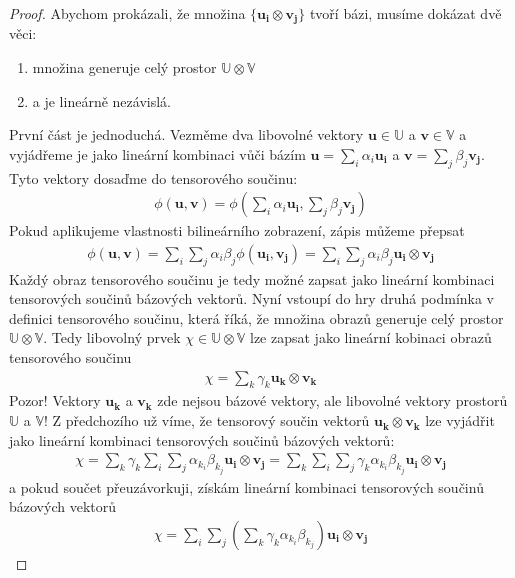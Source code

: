 \documentclass[a5paper,12pt]{amsbook}
\theoremstyle{definition}
\newcommand{\myvec}[1]{\bm{#1}}
\newcommand{\myspace}[1]{\mathbb{#1}}
\begin{document}
\begin{proof}
Abychom prokázali, že množina $\{\myvec{u_i}\otimes\myvec{v_j}\}$ tvoří bázi, musíme dokázat
dvě věci:
\begin{enumerate}
	\item množina generuje celý prostor $\myspace{U}\otimes\myspace{V}$
	\item a je lineárně nezávislá.
\end{enumerate}

První část je jednoduchá. Vezměme dva libovolné vektory $\myvec{u}\in\myspace{U}$ a
$\myvec{v}\in\myspace{V}$ a vyjádřeme je jako lineární kombinaci vůči bázím
$\myvec{u} = \sum_{i}\alpha_i\myvec{u_i}$ a $\myvec{v} = \sum_{j}\beta_j\myvec{v_j}$.
Tyto vektory dosaďme do tensorového součinu:
\begin{equation*}
\begin{split}
\phi(\myvec{u}, \myvec{v}) = \phi(\sum_{i}\alpha_i\myvec{u_i}, \sum_{j}\beta_j\myvec{v_j})
\end{split}
\end{equation*}
Pokud aplikujeme vlastnosti bilineárního zobrazení, zápis můžeme přepsat
\begin{equation*}
\begin{split}
\phi(\myvec{u}, \myvec{v}) = \sum_{i}\sum_{j}\alpha_i\beta_j\phi(\myvec{u_i}, \myvec{v_j})
  = \sum_{i}\sum_{j}\alpha_i\beta_j\myvec{u_i}\otimes\myvec{v_j}
\end{split}
\end{equation*}
Každý obraz tensorového součinu je tedy možné zapsat jako lineární kombinaci tensorových součinů
bázových vektorů. Nyní vstoupí do hry druhá podmínka v definici tensorového součinu, která říká,
že množina obrazů generuje celý prostor $\myspace{U}\otimes\myspace{V}$. Tedy libovolný prvek
$\chi\in\myspace{U}\otimes\myspace{V}$ lze zapsat jako lineární kobinaci obrazů tensorového
součinu
\begin{equation*}
\begin{split}
\chi = \sum_{k}\gamma_k\myvec{u_k}\otimes\myvec{v_k}
\end{split}
\end{equation*}
Pozor! Vektory $\myvec{u_k}$ a $\myvec{v_k}$ zde nejsou bázové vektory, ale libovolné vektory
prostorů $\myspace{U}$ a $\myspace{V}$! Z předchozího už víme, že tensorový součin vektorů
$\myvec{u_k}\otimes\myvec{v_k}$ lze vyjádřit jako lineární kombinaci tensorových součinů
bázových vektorů:
\begin{equation*}
\begin{split}
\chi = \sum_{k}\gamma_k\sum_{i}\sum_{j}\alpha_{k_i}\beta_{k_j}\myvec{u_i}\otimes\myvec{v_j}
  = \sum_{k}\sum_{i}\sum_{j}\gamma_k\alpha_{k_i}\beta_{k_j}\myvec{u_i}\otimes\myvec{v_j}
\end{split}
\end{equation*}
a pokud součet přeuzávorkuji, získám lineární kombinaci tensorových součinů bázových vektorů
\begin{equation*}
\begin{split}
\chi = \sum_{i}\sum_{j}(\sum_{k}\gamma_k\alpha_{k_i}\beta_{k_j})\myvec{u_i}\otimes\myvec{v_j}
\end{split}
\end{equation*}


\end{proof}
\end{document}
